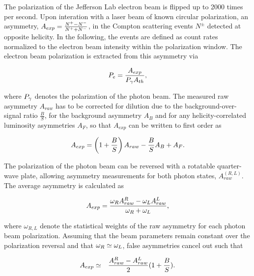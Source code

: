 The polarization of the Jefferson Lab electron beam is flipped up to 2000 times per second. Upon interation
with a laser beam of known circular polarization,
an asymmetry, $A_{exp} = \frac{N^{+}-N^{-}}{N^{+}+N^{-}}$,
in the Compton scattering events $N^{\pm}$ detected at opposite helicity.
In the following, the events are defined as count rates normalized
to the electron beam intensity within the polarization window.
The electron beam polarization is extracted from this
asymmetry via %

\begin{equation}
\displaystyle
P_{{e}} = \frac{A_{exp}}{P_{\gamma} A_{th}},
\label{eq:compton_def}
\end{equation}

\noindent
where $P_{\gamma}$ denotes the polarization of the photon beam.
The measured raw asymmetry $A_{raw}$
has to be corrected for
dilution due to the background-over-signal ratio $\frac{B}{S}$,
for the background asymmetry $A_B$ and for any helicity-correlated
luminosity asymmetries $A_F$, so that $A_{exp}$ can be
written to first order as

\begin{equation}
\displaystyle
A_{exp} =  \left( 1 + \frac{B}{S} \right) A_{raw} - \frac{B}{S} A_B
+ A_F.
\label{eq:compton_aexp}
\end{equation}

\noindent The polarization of the photon beam can be reversed with a
rotatable quarter-wave plate, allowing asymmetry measurements
for both photon states, $A_{raw}^{(R,L)}$.
The average asymmetry is calculated as

\begin{equation}
\displaystyle
A_{exp}  =  \frac{\omega_R A_{raw}^R - \omega_L A_{raw}^L}{\omega_R + \omega_L},
\label{eq:compton_asyRL}
\end{equation}

\noindent where $\omega_{R,L}$ denote the statistical weights of the
raw asymmetry for each photon beam polarization.
Assuming that the beam parameters remain constant over the
polarization reversal and that
$\omega_R \simeq \omega_L$, false asymmetries cancel out such that



\begin{eqnarray}
\displaystyle
A_{exp} & \simeq & \frac{A_{raw}^R - A_{raw}^L}{2}  (1 + \frac{B}{S}).
\label{eq:compton_adil}
\end{eqnarray}

